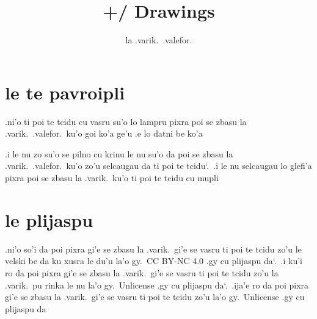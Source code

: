 \documentclass{report}
\title{+/ Drawings}
\author{la .varik.\ .valefor.}
\newcommand\sds{\spacefactor\sfcode`.\ \space}
\begin{document}
\maketitle{}
\tableofcontents{}
\chapter{le te pavroipli}
.ni'o ti poi te tcidu cu vasru su'o lo lampru pixra poi se zbasu la .varik.\ .valefor.\ ku'o goi ko'a ge'u .e lo datni be ko'a

.i le nu zo su'o se pilno cu krinu le nu su'o da poi se zbasu la .varik.\ .valefor.\ ku'o zo'u selcaugau da ti poi te tcidu\sds  .i le nu selcaugau lo glefi'a pixra poi se zbasu la .varik.\ ku'o ti poi te tcidu cu mupli

\chapter{le plijaspu}
.ni'o so'i da poi pixra gi'e se zbasu la .varik.\ gi'e se vasru ti poi te tcidu zo'u le velski be da ku xusra le du'u la'o gy.\ CC BY-NC 4.0 .gy cu plijaspu da\sds  .i ku'i ro da poi pixra gi'e se zbasu la .varik.\ gi'e se vasru ti poi te tcidu zo'u la .varik.\ pu rinka le nu la'o gy.\ Unlicense .gy cu plijaspu da\sds  .ija'e ro da poi pixra gi'e se zbasu la .varik.\ gi'e se vasru ti poi te tcidu zo'u la'o gy.\ Unlicense .gy cu plijaspu da
\end{document}
